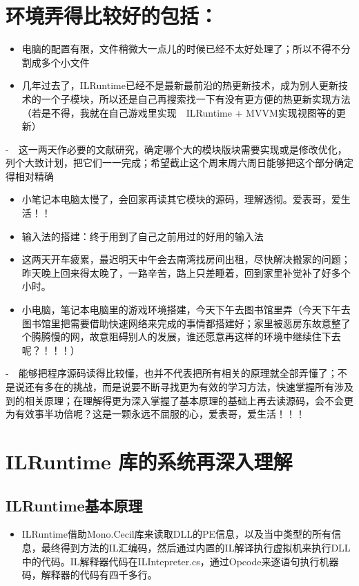 \documentclass[9pt, b5paper]{article}
\begin{document}
\section{环境弄得比较好的包括：}
\label{sec-6}
\begin{itemize}
\item 电脑的配置有限，文件稍微大一点儿的时候已经不太好处理了；所以不得不分割成多个小文件
\item 几年过去了，ILRuntime已经不是最新最前沿的热更新技术，成为别人更新技术的一个子模块，所以还是自己再搜索找一下有没有更方便的热更新实现方法（若是不得，我就在自己游戏里实现　ILRuntime + MVVM实现视图等的更新）
\end{itemize}
-　这一两天作必要的文献研究，确定哪个大的模块版块需要实现或是修改优化，列个大致计划，把它们一一完成；希望截止这个周末周六周日能够把这个部分确定得相对精确
\begin{itemize}
\item 小笔记本电脑太慢了，会回家再读其它模块的源码，理解透彻。爱表哥，爱生活！！
\item 输入法的搭建：终于用到了自己之前用过的好用的输入法
\item 这两天开车疲累，最迟明天中午会去南湾找房间出租，尽快解决搬家的问题；昨天晚上回来得太晚了，一路辛苦，路上只差睡着，回到家里补觉补了好多个小时。
\item 小电脑，笔记本电脑里的游戏环境搭建，今天下午去图书馆里弄（今天下午去图书馆里把需要借助快速网络来完成的事情都搭建好；家里被恶房东故意整了个腾腾慢的网，故意阻碍别人的发展，谁还愿意再这样的环境中继续住下去呢？！！！）
\end{itemize}
-　能够把程序源码读得比较懂，也并不代表把所有相关的原理就全部弄懂了；不是说还有多在的挑战，而是说要不断寻找更为有效的学习方法，快速掌握所有涉及到的相关原理；在理解得更为深入掌握了基本原理的基础上再去读源码，会不会更为有效事半功倍呢？这是一颗永远不屈服的心，爱表哥，爱生活！！！
\section{ILRuntime 库的系统再深入理解}
\label{sec-7}
\subsection{ILRuntime基本原理}
\label{sec-7-1}
\begin{itemize}
\item ILRuntime借助Mono.Cecil库来读取DLL的PE信息，以及当中类型的所有信息，最终得到方法的IL汇编码，然后通过内置的IL解译执行虚拟机来执行DLL中的代码。IL解释器代码在ILIntepreter.cs，通过Opcode来逐语句执行机器码，解释器的代码有四千多行。
\end{itemize}
\end{document}
